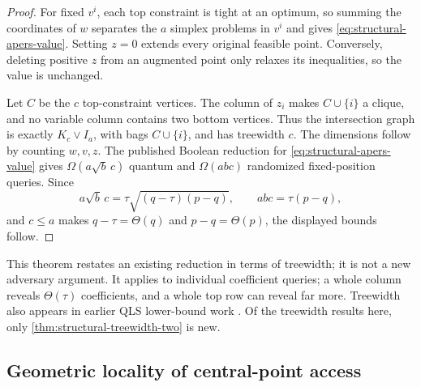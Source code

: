 \begin{proof}
For fixed $v^i$, each top constraint is tight at an optimum, so summing the
coordinates of $w$ separates the $a$ simplex problems in $v^i$ and gives
\eqref{eq:structural-apers-value}.  Setting $z=0$ extends every original
feasible point.  Conversely, deleting positive $z$ from an augmented point
only relaxes its inequalities, so the value is unchanged.

Let $C$ be the $c$ top-constraint vertices.  The column of $z_i$ makes
$C\cup\{i\}$ a clique, and no variable column contains two bottom vertices.
Thus the intersection graph is exactly $K_c\vee I_a$, with bags
$C\cup\{i\}$, and has treewidth $c$.  The dimensions follow by counting
$w,v,z$.  The published Boolean reduction for
\eqref{eq:structural-apers-value} gives
$\Omega(a\sqrt b\,c)$ quantum and $\Omega(abc)$ randomized fixed-position
queries.  Since
\[
 a\sqrt b\,c=\tau\sqrt{(q-\tau)(p-q)},\qquad
 abc=\tau(p-q),
\]
and $c\leq a$ makes $q-\tau=\Theta(q)$ and $p-q=\Theta(p)$, the displayed
bounds follow.
\end{proof}

This theorem restates an existing reduction
\cite{apers2026-quantum-speedups-linear-programming-interior} in terms of
treewidth; it is not a new adversary argument.  It applies to individual
coefficient queries; a whole column reveals $\Theta(\tau)$ coefficients,
and a whole top row can reveal far more.  Treewidth also appears in earlier
QLS lower-bound work \cite{khanpour2026-proving-limits-power-flow}.  Of the
treewidth results here, only \cref{thm:structural-treewidth-two} is new.

\subsection{Geometric locality of central-point access}
\label{sec:structural-geometric-locality}

